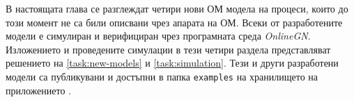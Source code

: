 \hspace*{2.5em}В настоящата глава се разглеждат четири нови ОМ модела на процеси, които до този момент не са били описвани чрез апарата на ОМ. Всеки от разработените модели е симулиран и верифициран чрез програмната среда \textit{OnlineGN}. Изложението и проведените симулации в тези четири раздела представляват решението на \ref{task:new-models} и \ref{task:simulation}. Тези и други разработени модели са публикувани и достъпни в папка \texttt{examples} на хранилището на приложението \cite{phdThesisOnlineGNRepo}.











